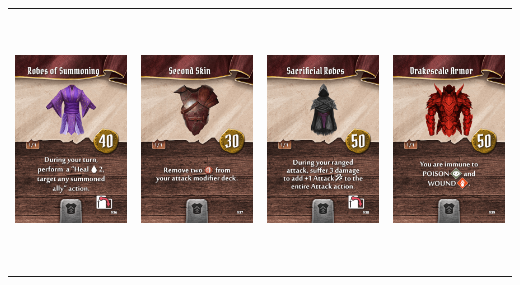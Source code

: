 \documentclass{minimal}
\begin{document}
{\begin{longtable}{llll}
\includegraphics[width=44mm,height=68mm]{./64-151/gh-100-robes-of-summoning.png} &
\includegraphics[width=44mm,height=68mm]{./64-151/gh-101-second-skin.png} &
\includegraphics[width=44mm,height=68mm]{./64-151/gh-102-sacrificial-robes.png} &
\includegraphics[width=44mm,height=68mm]{./64-151/gh-103-drakescale-armor.png}\\ 

\end{longtable}}
\end{document}
